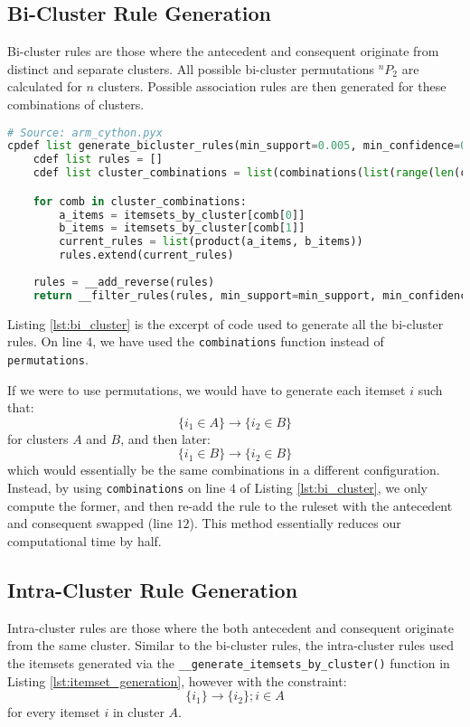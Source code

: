 \subsection{Bi-Cluster Rule Generation}
Bi-cluster rules are those where the antecedent and consequent originate from distinct and separate clusters. All possible bi-cluster permutations $^nP_2$ are calculated for $n$ clusters. Possible association rules are then generated for these combinations of clusters.


\begin{lstlisting}[language=Python, caption=Cluster Itemset Generation, label=lst:bi_cluster]
# Source: arm_cython.pyx
cpdef list generate_bicluster_rules(min_support=0.005, min_confidence=0.6):
    cdef list rules = []
    cdef list cluster_combinations = list(combinations(list(range(len(clusters))), 2))

    for comb in cluster_combinations:
        a_items = itemsets_by_cluster[comb[0]]
        b_items = itemsets_by_cluster[comb[1]]
        current_rules = list(product(a_items, b_items))
        rules.extend(current_rules)
    
    rules = __add_reverse(rules)
    return __filter_rules(rules, min_support=min_support, min_confidence=min_confidence)
\end{lstlisting}
Listing \ref{lst:bi_cluster} is the excerpt of code used to generate all the bi-cluster rules. On line $4$, we have used the \texttt{combinations} function instead of \texttt{permutations}. 

If we were to use permutations, we would have to generate each itemset $i$ such that: \[\{i_1 \in A\} \rightarrow \{i_2 \in B\}\] for clusters $A$ and $B$, and then later: \[\{i_1 \in B\} \rightarrow \{i_2 \in B\}\] which would essentially be the same combinations in a different configuration. Instead, by using \texttt{combinations} on line $4$ of Listing \ref{lst:bi_cluster}, we only compute the former, and then re-add the rule to the ruleset with the antecedent and consequent swapped (line $12$). This method essentially reduces our computational time by half.

\subsection{Intra-Cluster Rule Generation}
Intra-cluster rules are those where the both antecedent and consequent originate from the same cluster. Similar to the bi-cluster rules, the intra-cluster rules used the itemsets generated via the \texttt{\_\_generate\_itemsets\_by\_cluster()} function in Listing \ref{lst:itemset_generation}, however with the constraint:
\[\{i_1\} \rightarrow \{i_2\}; i \in A\] for every itemset $i$ in cluster $A$.

